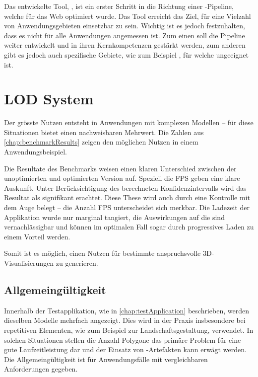 Das entwickelte Tool, , ist ein erster Schritt in die Richtung einer -Pipeline, welche für das Web optimiert wurde. Das Tool erreicht das Ziel, für eine Vielzahl von Anwendungsgebieten einsetzbar zu sein. Wichtig ist es jedoch festzuhalten, dass es nicht für alle Anwendungen angemessen ist. Zum einen soll die Pipeline weiter entwickelt und in ihren Kernkompetenzen gestärkt werden, zum anderen gibt es jedoch auch spezifische Gebiete, wie zum Beispiel , für welche  ungeeignet ist.

\section{LOD System}

Der grösste Nutzen entsteht in Anwendungen mit komplexen Modellen – für diese Situationen bietet  einen nachweisbaren Mehrwert. Die Zahlen aus \autoref{chap:benchmarkResults} zeigen den möglichen Nutzen in einem Anwendungsbeispiel.

Die Resultate des Benchmarks weisen einen klaren Unterschied zwischen der unoptimierten und optimierten Version auf. Speziell die \gls{FPS} geben eine klare Auskunft. Unter Berücksichtigung des berechneten Konfidenzintervalls wird das Resultat als signifikant erachtet. Diese These wird auch durch eine Kontrolle mit dem Auge belegt – die Anzahl \gls{FPS} unterscheidet sich merkbar. Die Ladezeit der Applikation wurde nur marginal tangiert, die Auswirkungen auf die  sind vernachlässigbar und können im optimalen Fall sogar durch progressives Laden zu einem Vorteil werden.

Somit ist es möglich, einen Nutzen für bestimmte anspruchsvolle 3D-Visualisierungen zu generieren.

\subsection{Allgemeingültigkeit}

Innerhalb der Testapplikation, wie in \autoref{chap:testApplication} beschrieben, werden dieselben Modelle mehrfach angezeigt. Dies wird in der Praxis insbesondere bei repetitiven Elementen, wie zum Beispiel zur Landschaftsgestaltung, verwendet. In solchen Situationen stellen die Anzahl Polygone das primäre Problem für eine gute Laufzeitleistung dar und der Einsatz von -Artefakten kann erwägt werden. Die Allgemeingültigkeit ist für Anwendungsfälle mit vergleichbaren Anforderungen gegeben.

